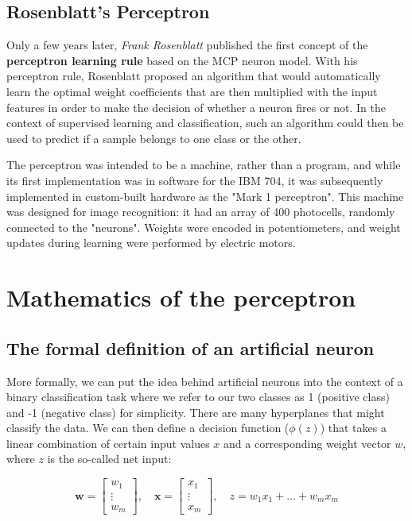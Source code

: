 \documentclass[11pt]{article}
\newcommand{\vect}[1]{\boldsymbol{#1}}
\begin{document}
    \subsection{Rosenblatt's Perceptron} \label{subsec:perceptron}

    Only a few years later, \textit{Frank Rosenblatt} published the first concept of the \textbf{perceptron learning rule} based on the MCP neuron model\cite{Rosenblatt1957a}.
    With his perceptron rule, Rosenblatt proposed an algorithm that would automatically learn the optimal weight coefficients that are then multiplied with the input features in order to make the decision of whether a neuron fires or not.
    In the context of supervised learning and classification, such an algorithm could then be used to predict if a sample belongs to one class or the other.

    The perceptron was intended to be a machine, rather than a program, and while its first implementation was in software for the IBM 704, it was subsequently implemented in custom-built hardware as the "Mark 1 perceptron".
    This machine was designed for image recognition: it had an array of 400 photocells, randomly connected to the "neurons".
    Weights were encoded in potentiometers, and weight updates during learning were performed by electric motors.

    \section{Mathematics of the perceptron} \label{sec:perc_math}

    \subsection{The formal definition of an artificial neuron} \label{subsec:neuron_def}

    More formally, we can put the idea behind artificial neurons into the context of a binary classification task where we refer to our two classes as 1 (positive class) and -1 (negative class) for simplicity.
    There are many hyperplanes that might classify the data.
    We can then define a decision function ($\phi(z)$) that takes a linear combination of certain input values $x$ and a corresponding weight vector $w$, where $z$ is the so-called net input:

    \begin{equation}
        \label{eq:net_input}
        \vect{w} = \begin{bmatrix}
                       w_1 \\ \vdots \\ w_m
        \end{bmatrix}, \quad
        \vect{x} = \begin{bmatrix}
                       x_1 \\ \vdots \\ x_m
        \end{bmatrix}, \quad
        z = w_1 x_1 + \dots + w_m x_m
    \end{equation}
\end{document}

